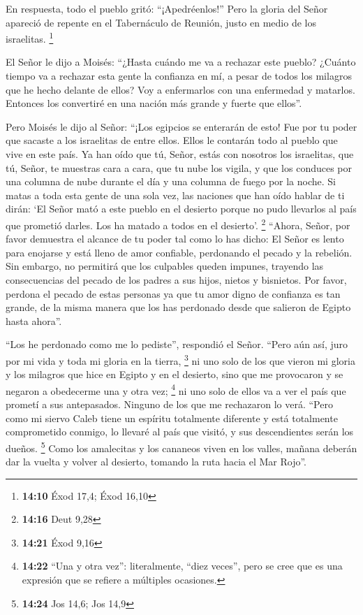  En respuesta, todo el pueblo gritó: ``¡Apedréenlos!''
Pero la gloria del Señor apareció de repente en el Tabernáculo de
Reunión, justo en medio de los israelitas. \footnote{\textbf{14:10} Éxod
  17,4; Éxod 16,10}

 El Señor le dijo a Moisés: ``¿Hasta cuándo me va a
rechazar este pueblo? ¿Cuánto tiempo va a rechazar esta gente la
confianza en mí, a pesar de todos los milagros que he hecho delante de
ellos?  Voy a enfermarlos con una enfermedad y matarlos.
Entonces los convertiré en una nación más grande y fuerte que ellos''.

 Pero Moisés le dijo al Señor: ``¡Los egipcios se
enterarán de esto! Fue por tu poder que sacaste a los israelitas de
entre ellos.  Ellos le contarán todo al pueblo que vive
en este país. Ya han oído que tú, Señor, estás con nosotros los
israelitas, que tú, Señor, te muestras cara a cara, que tu nube los
vigila, y que los conduces por una columna de nube durante el día y una
columna de fuego por la noche.  Si matas a toda esta
gente de una sola vez, las naciones que han oído hablar de ti dirán:
 `El Señor mató a este pueblo en el desierto porque no
pudo llevarlos al país que prometió darles. Los ha matado a todos en el
desierto'. \footnote{\textbf{14:16} Deut 9,28}  ``Ahora,
Señor, por favor demuestra el alcance de tu poder tal como lo has dicho:
 El Señor es lento para enojarse y está lleno de amor
confiable, perdonando el pecado y la rebelión. Sin embargo, no permitirá
que los culpables queden impunes, trayendo las consecuencias del pecado
de los padres a sus hijos, nietos y bisnietos.  Por
favor, perdona el pecado de estas personas ya que tu amor digno de
confianza es tan grande, de la misma manera que los has perdonado desde
que salieron de Egipto hasta ahora''.

 ``Los he perdonado como me lo pediste'', respondió el
Señor.  ``Pero aún así, juro por mi vida y toda mi gloria
en la tierra, \footnote{\textbf{14:21} Éxod 9,16}  ni uno
solo de los que vieron mi gloria y los milagros que hice en Egipto y en
el desierto, sino que me provocaron y se negaron a obedecerme una y otra
vez; \footnote{\textbf{14:22} ``Una y otra vez'': literalmente, ``diez
  veces'', pero se cree que es una expresión que se refiere a múltiples
  ocasiones.}  ni uno solo de ellos va a ver el país que
prometí a sus antepasados. Ninguno de los que me rechazaron lo verá.
 ``Pero como mi siervo Caleb tiene un espíritu totalmente
diferente y está totalmente comprometido conmigo, lo llevaré al país que
visitó, y sus descendientes serán los dueños. \footnote{\textbf{14:24}
  Jos 14,6; Jos 14,9}  Como los amalecitas y los cananeos
viven en los valles, mañana deberán dar la vuelta y volver al desierto,
tomando la ruta hacia el Mar Rojo''.

